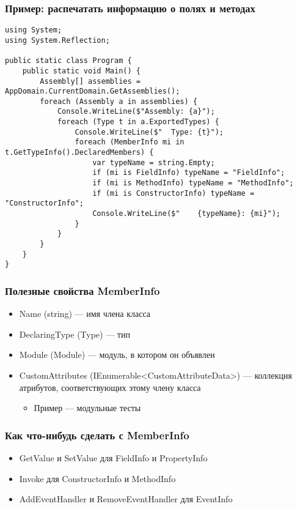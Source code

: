 \documentclass[xetex,mathserif,serif]{beamer}
\begin{document}
	\begin{frame}[fragile]
		\frametitle{Пример: распечатать информацию о полях и методах}
		\begin{scriptsize}
			\begin{verbatim}
using System;
using System.Reflection;

public static class Program {
    public static void Main() {
        Assembly[] assemblies = AppDomain.CurrentDomain.GetAssemblies();
        foreach (Assembly a in assemblies) {
            Console.WriteLine($"Assembly: {a}");
            foreach (Type t in a.ExportedTypes) {
                Console.WriteLine($"  Type: {t}");
                foreach (MemberInfo mi in t.GetTypeInfo().DeclaredMembers) {
                    var typeName = string.Empty;
                    if (mi is FieldInfo) typeName = "FieldInfo";
                    if (mi is MethodInfo) typeName = "MethodInfo";
                    if (mi is ConstructorInfo) typeName = "ConstructorInfo";
                    Console.WriteLine($"    {typeName}: {mi}");
                }
            }
        }
    }
}
			\end{verbatim}
		\end{scriptsize}
	\end{frame}

	\begin{frame}
		\frametitle{Полезные свойства MemberInfo}
		\begin{itemize}
			\item Name (string) --- имя члена класса
			\item DeclaringType (Type) --- тип
			\item Module (Module) --- модуль, в котором он объявлен
			\item CustomAttributes (IEnumerable<CustomAttributeData>) --- коллекция атрибутов, соответствующих этому члену класса
			\begin{itemize}
				\item Пример --- модульные тесты
			\end{itemize}
		\end{itemize}
	\end{frame}

	\begin{frame}
		\frametitle{Как что-нибудь сделать с MemberInfo}
		\begin{itemize}
			\item GetValue и SetValue для FieldInfo и PropertyInfo
			\item Invoke для ConstructorInfo и MethodInfo
			\item AddEventHandler и RemoveEventHandler для EventInfo
		\end{itemize}
	\end{frame}
\end{document}
